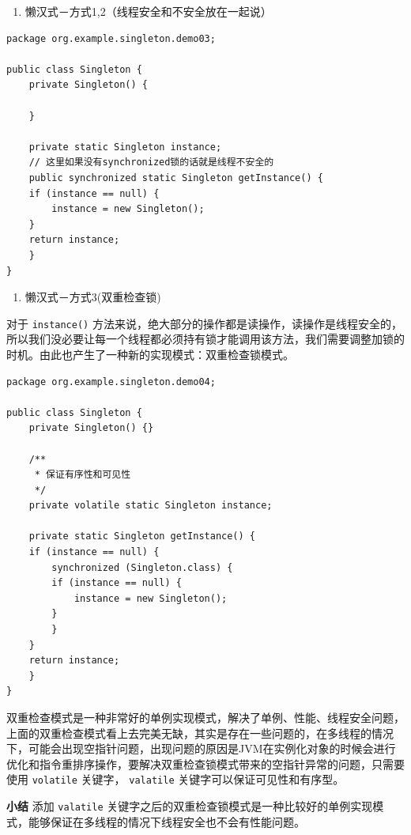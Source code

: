 \documentclass[11pt]{article}
\begin{document}
\begin{enumerate}
\item 懒汉式－方式1,2（线程安全和不安全放在一起说）
\end{enumerate}
\begin{verbatim}
package org.example.singleton.demo03;

public class Singleton {
    private Singleton() {

    }

    private static Singleton instance;
    // 这里如果没有synchronized锁的话就是线程不安全的
    public synchronized static Singleton getInstance() {
	if (instance == null) {
	    instance = new Singleton();
	}
	return instance;
    }
}
\end{verbatim}



\begin{enumerate}
\item 懒汉式－方式3(双重检查锁)
\end{enumerate}
对于 \texttt{instance()} 方法来说，绝大部分的操作都是读操作，读操作是线程安全的，所以我们没必要让每一个线程都必须持有锁才能调用该方法，我们需要调整加锁的时机。由此也产生了一种新的实现模式：双重检查锁模式。
\begin{verbatim}
package org.example.singleton.demo04;

public class Singleton {
    private Singleton() {}

    /**
     * 保证有序性和可见性
     */
    private volatile static Singleton instance;

    private static Singleton getInstance() {
	if (instance == null) {
	    synchronized (Singleton.class) {
		if (instance == null) {
		    instance = new Singleton();
		}
	    }
	}
	return instance;
    }
}
\end{verbatim}
双重检查模式是一种非常好的单例实现模式，解决了单例、性能、线程安全问题，上面的双重检查模式看上去完美无缺，其实是存在一些问题的，在多线程的情况下，可能会出现空指针问题，出现问题的原因是JVM在实例化对象的时候会进行优化和指令重排序操作，要解决双重检查锁模式带来的空指针异常的问题，只需要使用 \texttt{volatile} 关键字， \texttt{valatile} 关键字可以保证可见性和有序型。


\textbf{小结}
添加 \texttt{valatile} 关键字之后的双重检查锁模式是一种比较好的单例实现模式，能够保证在多线程的情况下线程安全也不会有性能问题。
\end{document}
